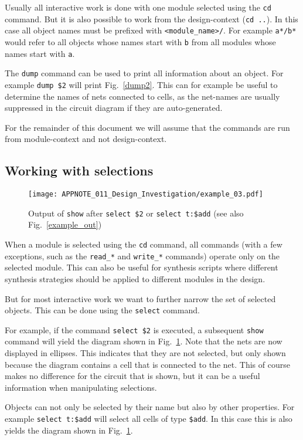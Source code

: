 \documentclass[9pt,technote,a4paper]{IEEEtran}
\begin{document}
Usually all interactive work is done with one module selected using the {\tt cd}
command. But it is also possible to work from the design-context ({\tt cd ..}). In
this case all object names must be prefixed with {\tt <module\_name>/}. For
example {\tt a*/b*} would refer to all objects whose names start with {\tt b} from
all modules whose names start with {\tt a}.

The {\tt dump} command can be used to print all information about an object.
For example {\tt dump \$2} will print Fig.~\ref{dump2}. This can for example
be useful to determine the names of nets connected to cells, as the net-names
are usually suppressed in the circuit diagram if they are auto-generated.

For the remainder of this document we will assume that the commands are run from
module-context and not design-context.

\subsection{Working with selections}

\begin{figure}[t]
\texttt{[image: APPNOTE\_011\_Design\_Investigation/example\_03.pdf]}
\caption{Output of {\tt show} after {\tt select \$2} or {\tt select t:\$add}
(see also Fig.~\ref{example_out})}
\label{seladd}
\end{figure}

When a module is selected using the {\tt cd} command, all commands (with a few
exceptions, such as the {\tt read\_*} and {\tt write\_*} commands) operate
only on the selected module. This can also be useful for synthesis scripts
where different synthesis strategies should be applied to different modules
in the design.

But for most interactive work we want to further narrow the set of selected
objects. This can be done using the {\tt select} command.

For example, if the command {\tt select \$2} is executed, a subsequent {\tt show}
command will yield the diagram shown in Fig.~\ref{seladd}. Note that the nets are
now displayed in ellipses. This indicates that they are not selected, but only
shown because the diagram contains a cell that is connected to the net. This
of course makes no difference for the circuit that is shown, but it can be a useful
information when manipulating selections.

Objects can not only be selected by their name but also by other properties.
For example {\tt select t:\$add} will select all cells of type {\tt \$add}. In
this case this is also yields the diagram shown in Fig.~\ref{seladd}.
\end{document}
